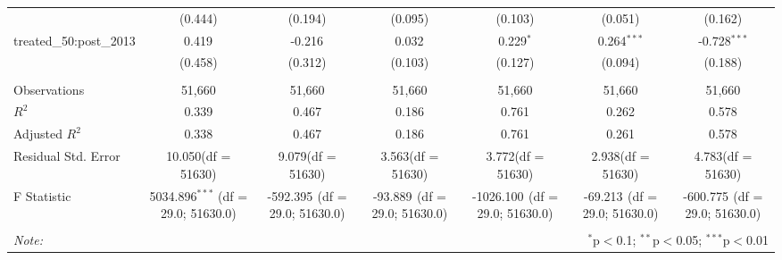 \begin{table}[!htbp]
\begin{tabular}{@{\extracolsep{5pt}}lcccccc}
  & (0.444) & (0.194) & (0.095) & (0.103) & (0.051) & (0.162) \\
 treated_50:post_2013 & 0.419$^{}$ & -0.216$^{}$ & 0.032$^{}$ & 0.229$^{*}$ & 0.264$^{***}$ & -0.728$^{***}$ \\
  & (0.458) & (0.312) & (0.103) & (0.127) & (0.094) & (0.188) \\
\hline \\[-1.8ex]
 Observations & 51,660 & 51,660 & 51,660 & 51,660 & 51,660 & 51,660 \\
 $R^2$ & 0.339 & 0.467 & 0.186 & 0.761 & 0.262 & 0.578 \\
 Adjusted $R^2$ & 0.338 & 0.467 & 0.186 & 0.761 & 0.261 & 0.578 \\
 Residual Std. Error & 10.050(df = 51630) & 9.079(df = 51630) & 3.563(df = 51630) & 3.772(df = 51630) & 2.938(df = 51630) & 4.783(df = 51630)  \\
 F Statistic & 5034.896$^{***}$ (df = 29.0; 51630.0) & -592.395$^{}$ (df = 29.0; 51630.0) & -93.889$^{}$ (df = 29.0; 51630.0) & -1026.100$^{}$ (df = 29.0; 51630.0) & -69.213$^{}$ (df = 29.0; 51630.0) & -600.775$^{}$ (df = 29.0; 51630.0) \\
\hline
\hline \\[-1.8ex]
\textit{Note:} & \multicolumn{6}{r}{$^{*}$p$<$0.1; $^{**}$p$<$0.05; $^{***}$p$<$0.01} \\
\end{tabular}
\end{table}